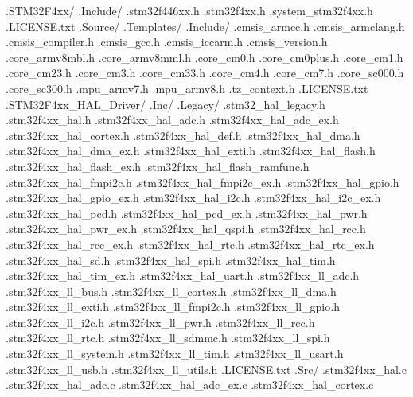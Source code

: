 \documentclass{article}
\begin{document}
{            .STM32F4xx/
              .Include/
                .stm32f446xx.h
                .stm32f4xx.h
                .system_stm32f4xx.h
              .LICENSE.txt
              .Source/
                .Templates/
        .Include/
          .cmsis_armcc.h
          .cmsis_armclang.h
          .cmsis_compiler.h
          .cmsis_gcc.h
          .cmsis_iccarm.h
          .cmsis_version.h
          .core_armv8mbl.h
          .core_armv8mml.h
          .core_cm0.h
          .core_cm0plus.h
          .core_cm1.h
          .core_cm23.h
          .core_cm3.h
          .core_cm33.h
          .core_cm4.h
          .core_cm7.h
          .core_sc000.h
          .core_sc300.h
          .mpu_armv7.h
          .mpu_armv8.h
          .tz_context.h
        .LICENSE.txt
      .STM32F4xx_HAL_Driver/
        .Inc/
          .Legacy/
            .stm32_hal_legacy.h
          .stm32f4xx_hal.h
          .stm32f4xx_hal_adc.h
          .stm32f4xx_hal_adc_ex.h
          .stm32f4xx_hal_cortex.h
          .stm32f4xx_hal_def.h
          .stm32f4xx_hal_dma.h
          .stm32f4xx_hal_dma_ex.h
          .stm32f4xx_hal_exti.h
          .stm32f4xx_hal_flash.h
          .stm32f4xx_hal_flash_ex.h
          .stm32f4xx_hal_flash_ramfunc.h
          .stm32f4xx_hal_fmpi2c.h
          .stm32f4xx_hal_fmpi2c_ex.h
          .stm32f4xx_hal_gpio.h
          .stm32f4xx_hal_gpio_ex.h
          .stm32f4xx_hal_i2c.h
          .stm32f4xx_hal_i2c_ex.h
          .stm32f4xx_hal_pcd.h
          .stm32f4xx_hal_pcd_ex.h
          .stm32f4xx_hal_pwr.h
          .stm32f4xx_hal_pwr_ex.h
          .stm32f4xx_hal_qspi.h
          .stm32f4xx_hal_rcc.h
          .stm32f4xx_hal_rcc_ex.h
          .stm32f4xx_hal_rtc.h
          .stm32f4xx_hal_rtc_ex.h
          .stm32f4xx_hal_sd.h
          .stm32f4xx_hal_spi.h
          .stm32f4xx_hal_tim.h
          .stm32f4xx_hal_tim_ex.h
          .stm32f4xx_hal_uart.h
          .stm32f4xx_ll_adc.h
          .stm32f4xx_ll_bus.h
          .stm32f4xx_ll_cortex.h
          .stm32f4xx_ll_dma.h
          .stm32f4xx_ll_exti.h
          .stm32f4xx_ll_fmpi2c.h
          .stm32f4xx_ll_gpio.h
          .stm32f4xx_ll_i2c.h
          .stm32f4xx_ll_pwr.h
          .stm32f4xx_ll_rcc.h
          .stm32f4xx_ll_rtc.h
          .stm32f4xx_ll_sdmmc.h
          .stm32f4xx_ll_spi.h
          .stm32f4xx_ll_system.h
          .stm32f4xx_ll_tim.h
          .stm32f4xx_ll_usart.h
          .stm32f4xx_ll_usb.h
          .stm32f4xx_ll_utils.h
        .LICENSE.txt
        .Src/
          .stm32f4xx_hal.c
          .stm32f4xx_hal_adc.c
          .stm32f4xx_hal_adc_ex.c
          .stm32f4xx_hal_cortex.c
}
\end{document}
